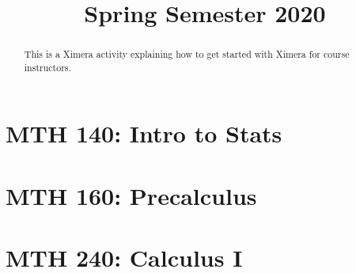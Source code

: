 \documentclass{xourse}
\title{Spring Semester 2020}
\begin{document}
  
\begin{abstract} %
This is a Ximera activity explaining how to get  
started with Ximera for course instructors.  
\end{abstract}  
\maketitle  
\part{MTH 140: Intro to Stats} 

\part{MTH 160: Precalculus}

\part{MTH 240: Calculus I}

 
\end{document}
